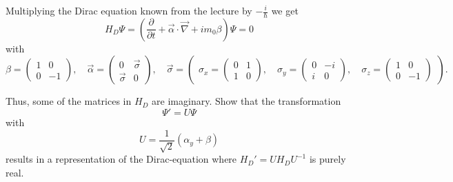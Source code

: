 \begin{Problem}

Multiplying the Dirac equation known from the lecture by \( -\frac{i}{\hbar} \) we get 
\[ H_D \Psi = \left(\frac{\partial}{\partial t} + \vec{\alpha} \cdot \vec{\nabla} + im_0 \beta\right) \Psi = 0\]
with 
\[ \beta = \begin{pmatrix} 1 & 0 \\ 0 & -1 \end{pmatrix}, \quad \vec{\alpha} = \begin{pmatrix} 0 & \vec{\sigma} \\ \vec{\sigma} & 0 \end{pmatrix}, \quad \vec{\sigma} = \begin{pmatrix} \sigma_x = \begin{pmatrix} 0 & 1 \\ 1 & 0 \end{pmatrix}, \quad \sigma_y = \begin{pmatrix} 0 & -i \\ i & 0 \end{pmatrix}, \quad \sigma_z = \begin{pmatrix} 1 & 0 \\ 0 & -1 \end{pmatrix} \end{pmatrix}. \]

Thus, some of the matrices in \( H_D \) are imaginary. Show that the transformation 
\[ \Psi' = U \Psi \tag{4} \]
with 
\[ U = \frac{1}{\sqrt{2}}(\alpha_y + \beta) \]
results in a representation of the Dirac-equation where \( H_D' = UH_DU^{-1} \) is purely real.
\end{Problem}
